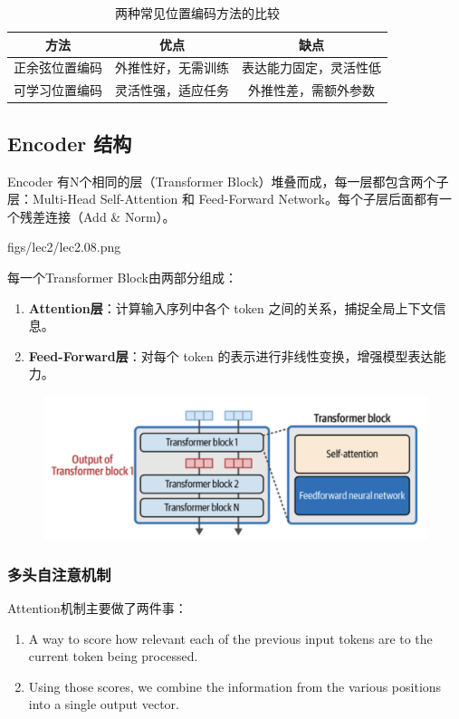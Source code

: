 \begin{table}[H]
\centering
\begin{tabular}{|c|c|c|}
\hline
方法 & 优点 & 缺点 \\
\hline
正余弦位置编码 & 外推性好，无需训练 & 表达能力固定，灵活性低 \\
可学习位置编码 & 灵活性强，适应任务 & 外推性差，需额外参数 \\
\hline
\end{tabular}
\caption{两种常见位置编码方法的比较}
\end{table}


\clearpage
\subsection{Encoder 结构}
Encoder 有N个相同的层（Transformer Block）堆叠而成，每一层都包含两个子层：Multi-Head Self-Attention 和 Feed-Forward Network。每个子层后面都有一个残差连接（Add \& Norm）。

\MarginImageWithNote
  {figs/lec2/lec2.08.png}
  {}

每一个Transformer Block由两部分组成：
\begin{enumerate}
  \item \textbf{Attention层}：计算输入序列中各个 token 之间的关系，捕捉全局上下文信息。
  \item \textbf{Feed-Forward层}：对每个 token 的表示进行非线性变换，增强模型表达能力。  
\end{enumerate} 

\begin{figure}[htbp]
  \centering
  \includegraphics[width=1\linewidth]{figs/lec2/lec2.09.png}
  \label{fig:Transformer Encoder Block}
\end{figure}

\subsubsection{多头自注意机制}
Attention机制主要做了两件事：
\begin{enumerate}
  \item A way to score how {\color{tred}relevant} each of the previous input tokens are to the current token being processed.

  \item Using those scores, we {\color{tred}combine the information} from the various positions into a single output vector.
\end{enumerate}   


